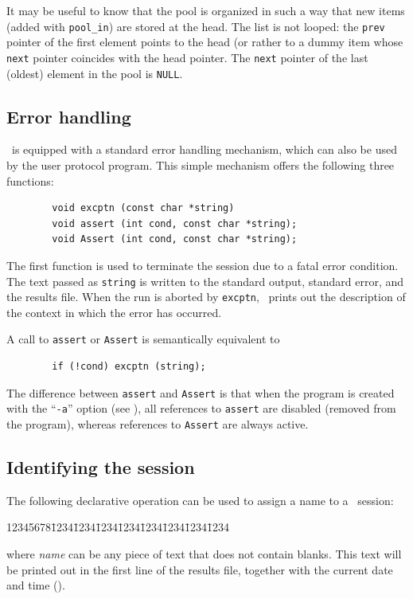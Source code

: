 It may be useful to know that the pool is organized in such a way that new
items (added with {\tt pool\_in}) are stored at the head.
The list is not looped: the {\tt prev} pointer of the first element points to
the head (or rather to a dummy item whose {\tt next} pointer coincides
with the head pointer.
The {\tt next} pointer of the last (oldest) element in the pool is {\tt NULL}.

\subsection{Error handling}
\label{rm_au_eh}

\smurph\ is equipped with a standard error handling mechanism, which can also
be used by the user protocol program.
This simple mechanism offers the following three functions:
\begin{verbatim}
        void excptn (const char *string)
        void assert (int cond, const char *string);
        void Assert (int cond, const char *string);
\end{verbatim}

The first function is used to terminate the session due to a fatal error
condition. The text passed as {\tt string} is written to the standard
output, standard error, and the results file.
When the run is aborted by {\tt excptn}, \smurph\ prints out the
description of the context in which the error has occurred.

A call to {\tt assert} or {\tt Assert} is semantically equivalent to
\begin{verbatim}
        if (!cond) excptn (string);
\end{verbatim}
The difference between {\tt assert} and {\tt Assert} is that
when the program is created with the ``{\tt -a}'' option (see
), all references to {\tt assert} are disabled (removed
from the program), whereas references to {\tt Assert} are always
active.

\subsection{Identifying the session}
\label{rm_au_id}

The following declarative operation can be used to assign a name to
a \smurph\ session:
{\tt\begin{tabbing}
12345678\=1234\=1234\=1234\=1234\=1234\=1234\=1234\=1234\kill
{}
\end{tabbing}}
\noindent
where {\em name\/} can be any piece of text that does not contain blanks.
This text will be printed out in the first line of the results
file, together with the current date and time ().


